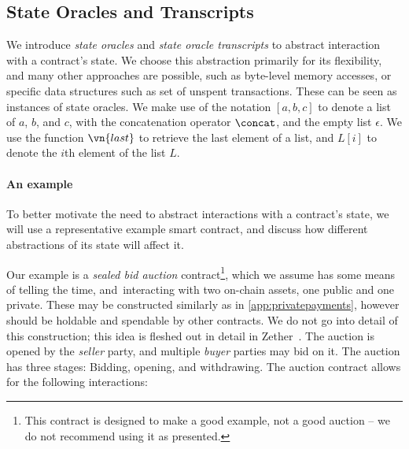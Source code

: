 \subsection{State Oracles and Transcripts}
\label{sec:oracles}
\label{sec:context}
\label{sec:auctionexample}

We introduce \emph{state oracles} and \emph{state oracle transcripts} to
abstract interaction with a contract's state. We choose this abstraction
primarily for its flexibility, and many other approaches are possible, such as
byte-level memory accesses, or specific data structures such as set of unspent
transactions. These can be seen as instances of state oracles. We make use
  of the notation $[a, b, c]$ to denote a list of $a$, $b$, and $c$, with the
  concatenation operator $\concat$, and the empty list $\epsilon$. We
  use the function $\vn{last}$ to retrieve the last element of a list, and
  $L[i]$ to denote the $i$th element of the list $L$.

\paragraph{An example}

To better motivate the need to abstract interactions with a contract's state, we
will use a representative example smart contract, and discuss how different
abstractions of its state will affect it.

Our example is a \emph{sealed bid auction} contract\footnote{This contract is
  designed to make a good example, not a good auction -- we do not recommend
  using it as presented.}, which we assume has some means of telling the time,
and\ interacting with two on-chain assets, one public and one private. These may be
  constructed similarly as in \autoref{app:privatepayments}, however should be
  holdable and spendable by other contracts. We do not go into detail of this
  construction; this idea is fleshed out in detail in Zether~\cite{zether}.
The auction is opened by the \emph{seller} party, and multiple \emph{buyer}
parties may bid on it. The auction has three stages: Bidding, opening, and
withdrawing. The auction contract allows for the following
interactions:

